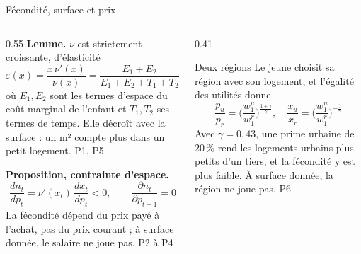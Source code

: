 \documentclass[10pt,aspectratio=169]{beamer}
\begin{document}
\begin{frame}{Fécondité, surface et prix}
	\begin{columns}[T]
		\begin{column}{0.55\textwidth}
			\footnotesize
			{\color{tdtenavy}\bfseries Lemme.} $\nu$ est strictement croissante, d'élasticité
			\[ \varepsilon(x) = \frac{x\,\nu'(x)}{\nu(x)} = \frac{E_1+E_2}{E_1+E_2+T_1+T_2} \in (0,1), \]
			où $E_1, E_2$ sont les termes d'espace du coût marginal de l'enfant et $T_1, T_2$ ses termes de temps. Elle décroît avec la surface : un m² compte plus dans un petit logement. {\color{tdtegrey}P1, P5}

			\medskip
			{\color{tdtenavy}\bfseries Proposition, contrainte d'espace.}
			\[ \frac{dn_t}{dp_t} = \nu'(x_t)\,\frac{dx_t}{dp_t} < 0, \qquad \frac{\partial n_t}{\partial p_{t+1}} = 0 \]
			La fécondité dépend du prix payé à l'achat, pas du prix courant ; à surface donnée, le salaire ne joue pas. {\color{tdtegrey}P2 à P4}
		\end{column}
		\begin{column}{0.41\textwidth}
			\begin{callout}[tdtenavy]{Deux régions}
				\footnotesize\RaggedRight Le jeune choisit sa région avec son logement, et l'égalité des utilités donne
				\[ \frac{p_u}{p_r} = \Big(\frac{w_1^u}{w_1^r}\Big)^{\frac{1+\gamma}{\gamma}}, \quad
				   \frac{x_u}{x_r} = \Big(\frac{w_1^u}{w_1^r}\Big)^{-\frac{1}{\gamma}} \]
				Avec $\gamma = 0{,}43$, une prime urbaine de 20\,\% rend les logements urbains plus petits d'un tiers, et la fécondité y est plus faible. À surface donnée, la région ne joue pas. {\color{tdtegrey}P6}
			\end{callout}
		\end{column}
	\end{columns}
\end{frame}
\end{document}
